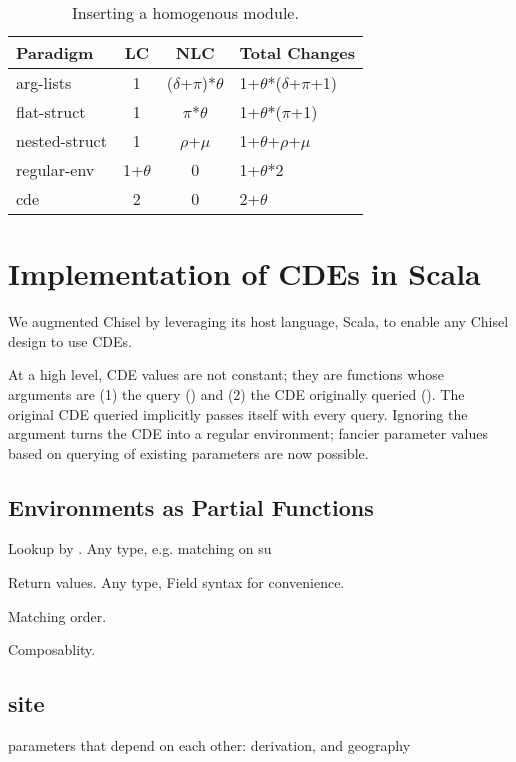 \begin{table}
\centering
\begin{tabular*}{0.45\textwidth}{lccl}
\toprule
Paradigm    & LC & NLC & Total Changes\\
\midrule
arg-lists      &  1 & ($\delta$+$\pi$)*$\theta$& 1+$\theta$*($\delta$+$\pi$+1)  \\
flat-struct  &  1 & $\pi$*$\theta$ & 1+$\theta$*($\pi$+1)  \\
nested-struct    &  1 & $\rho$+$\mu$ & 1+$\theta$+$\rho$+$\mu$  \\
regular-env    &  1+$\theta$ & 0 & 1+$\theta$*2 \\
cde &  2 & 0 & 2+$\theta$  \\
\bottomrule
\end{tabular*}
\caption{Inserting a homogenous module.}
\label{hom:ins}
\end{table}


\section{Implementation of CDEs in Scala}
\label{sec:impl}

We augmented Chisel by leveraging its host language, Scala, to enable any Chisel design to use CDEs. 

At a high level, CDE values are not constant; they are functions whose arguments are 
(1) the query () and 
(2) the CDE originally queried (). 
The original CDE queried implicitly passes itself with every query. 
Ignoring the  argument turns the CDE into a regular environment; fancier parameter values based on querying  of existing parameters are now possible. 

\subsection{Environments as Partial Functions}

Lookup by .
Any type, e.g. matching on su

Return values.
Any type,
Field syntax for convenience.

Matching order.

Composablity.

\subsection{site}

parameters that depend on each other:
derivation, and
geography

